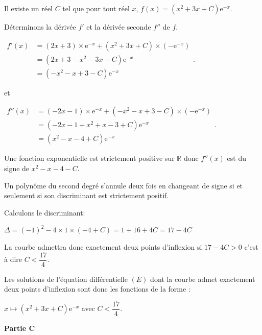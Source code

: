 \documentclass[10pt]{article}
\providecommand{\R}{\mathbb{R}}
\providecommand{\e}{{\mathrm{e}}}
\begin{document}
\begin{enumerate}
Il existe un réel $C$ tel que pour tout réel $x$, $f(x)= \left(x^{2}+3 x+C\right) \e^{-x}$. 

Déterminons la dérivée $f'$ et la dérivée seconde $f''$ de $f$. 

$\begin{aligned}
f'(x) & = \left(2x+3\right) \times \e^{-x}+ \left(x^2+3x+C\right)\times (-\e^{-x})\\
	& = \left(2x+3-x^2-3x-C\right)\e^{-x}\\
	& =\left(-x^2-x+3-C\right)\e^{-x}
\end{aligned}$.

et

$\begin{aligned}
f''(x) & = \left(-2x-1\right) \times \e^{-x}+ \left(-x^2-x+3-C\right)\times (-\e^{-x})\\
	& = \left(-2x-1+x^2+x-3+C\right)\e^{-x}\\
	& =\left(x^2-x-4+C\right)\e^{-x}
	\end{aligned}$.

Une fonction exponentielle est strictement positive sur $\R$ donc $f''(x)$ est du signe de $x^2-x-4-C$.

Un polynôme du second degré s'annule deux fois en changeant de signe  si et seulement si son discriminant est strictement positif.

Calculons le discriminant:

$\Delta = (-1)^2 -4 \times 1 \times (-4+C) = 1+16+4C=17-4C$

La courbe admettra donc exactement deux points d'inflexion si $17- 4C > 0$ c'est à dire $C < \dfrac{17}{4}$.

Les solutions de l'équation différentielle $(E)$ dont la courbe admet exactement deux points d'inflexion sont donc les fonctions de la forme :

$x\longmapsto \left(x^{2}+3 x+C\right) \e^{-x} $  avec $C<\dfrac{17}{4}$.
\end{enumerate}

\medskip

\textbf{Partie C}

\medskip
\end{document}

